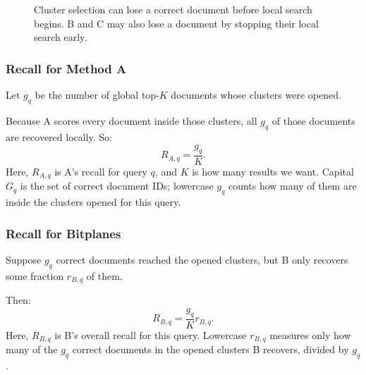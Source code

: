 \begin{figure}[htbp]\centering
{}
\caption{Cluster selection can lose a correct document before local search begins. B and C may also lose a document by stopping their local search early.}
\end{figure}

\subsubsection{Recall for Method A}
Let $g_q$ be the number of global top-$K$ documents whose clusters were opened.

Because A scores every document inside those clusters, all $g_q$ of those documents are recovered locally. So:
\[
R_{A,q}=\frac{g_q}{K}.
\]
Here, $R_{A,q}$ is A's recall for query $q$, and $K$ is how many results we want. Capital $G_q$ is the set of correct document IDs; lowercase $g_q$ counts how many of them are inside the clusters opened for this query.

\subsubsection{Recall for Bitplanes}
Suppose $g_q$ correct documents reached the opened clusters, but B only recovers some fraction $r_{B,q}$ of them.

Then:
\[
R_{B,q}=\frac{g_q}{K}r_{B,q}.
\]
Here, $R_{B,q}$ is B's overall recall for this query. Lowercase $r_{B,q}$ measures only how many of the $g_q$ correct documents in the opened clusters B recovers, divided by $g_q$.

